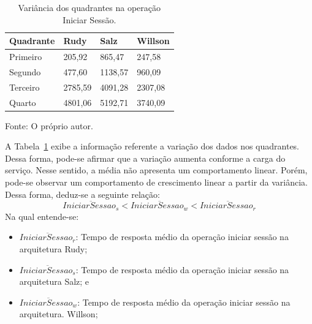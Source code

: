 \begin{table}[htb!]
\centering
\begin{adjustbox}{max width=\textwidth}
\caption{Variância dos quadrantes na operação Iniciar Sessão.}
\label{tab:op_start_session_var}
\begin{tabular}{l|l|l|l}

\hline \hline

Quadrante & Rudy    & Salz    & Willson \\ \hline \hline

Primeiro  & 205,92 & 865,47 & 247,58 \\ \hline

Segundo   & 477,60 & 1138,57 & 960,09 \\ \hline

Terceiro  & 2785,59 & 4091,28 & 2307,08 \\ \hline

Quarto    & 4801,06 & 5192,71 & 3740,09 \\ \hline \hline

\end{tabular}

\end{adjustbox}

Fonte: O próprio autor.
\end{table}

A Tabela~\ref{tab:op_start_session_var} exibe a informação referente a variação dos dados nos quadrantes.
%
Dessa forma, pode-se afirmar que a variação aumenta conforme a carga do serviço.
%
Nesse sentido, a média não apresenta um comportamento linear.
%
Porém, pode-se observar um comportamento de crescimento linear a partir da variância.
%
Dessa forma, deduz-se a seguinte relação:
\vspace{-0.3cm}
$$
  \overline{IniciarSessao_{s}} < \overline{IniciarSessao_{w}} <\overline{IniciarSessao_{r}}
$$
\vspace{-0.3cm}
Na qual entende-se:
\vspace{-0.3cm}
\begin{itemize}
 \item $\overline{IniciarSessao_{r}}$: Tempo de resposta médio da operação iniciar sessão na arquitetura Rudy;
 \vspace{-0.3cm}
 \item $\overline{IniciarSessao_{s}}$: Tempo de resposta médio da operação iniciar sessão na arquitetura Salz; e
 \vspace{-0.3cm}
 \item $\overline{IniciarSessao_{w}}$: Tempo de resposta médio da operação iniciar sessão na arquitetura. Willson;
\end{itemize}

